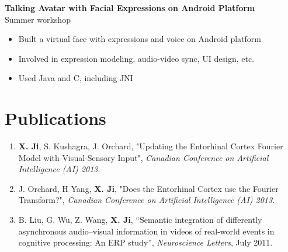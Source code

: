 \documentclass[margin]{res}
\begin{document}
\begin{resume}
 {\bf Talking Avatar with Facial Expressions on Android Platform}\\
 Summer workshop
  \begin{itemize} \itemsep -2pt
   \item Built a virtual face with expressions and voice on Android platform
   \item Involved in expression modeling, audio-video sync, UI design, etc.
   \item Used Java and C, including JNI
 \end{itemize}



\section{Publications} 

 \begin{enumerate} \itemsep -2pt
\item {\bf X. Ji}, S. Kushagra, J. Orchard, "Updating the Entorhinal Cortex Fourier Model with Visual-Sensory Input", {\em Canadian Conference on Artificial Intelligence (AI) 2013}.
\item J. Orchard, H Yang, {\bf X. Ji}, "Does the Entorhinal Cortex use the Fourier Transform?",  {\em Canadian Conference on Artificial Intelligence (AI) 2013}.
\item B. Liu, G. Wu, Z. Wang, {\bf X. Ji}, ``Semantic integration of differently asynchronous audio–visual information in videos of real-world events in cognitive processing: An ERP study'', {\em Neuroscience Letters}, July 2011. 
\end{enumerate}

\end{resume} 
\end{document}

